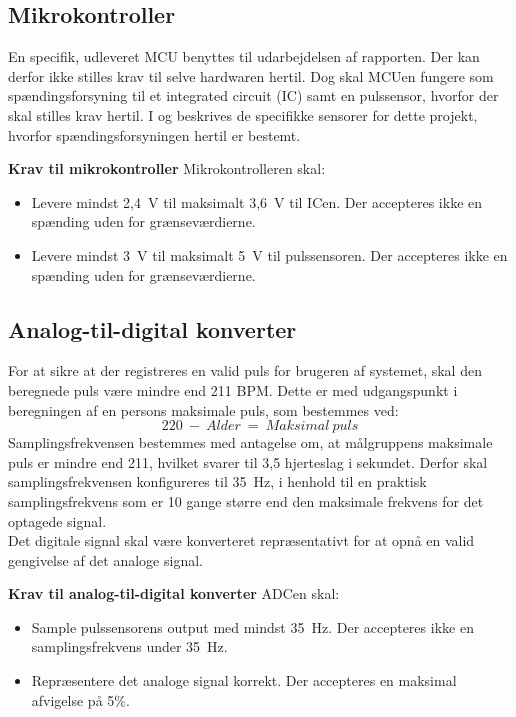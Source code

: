 \subsection{Mikrokontroller} \label{krav_mikro_spaending}
En specifik, udleveret MCU benyttes til udarbejdelsen af rapporten. Der kan derfor ikke stilles krav til selve hardwaren hertil. Dog skal MCUen fungere som spændingsforsyning til et integrated circuit (IC) samt en pulssensor, hvorfor der skal stilles krav hertil. I  og  beskrives de specifikke sensorer for dette projekt, hvorfor spændingsforsyningen hertil er bestemt.

\textbf{Krav til mikrokontroller} \newline 
Mikrokontrolleren skal:
\begin{itemize}
	\item Levere mindst 2,4~V til maksimalt 3,6~V til ICen. Der accepteres ikke en spænding uden for grænseværdierne.
	\item Levere mindst 3~V til maksimalt 5~V til pulssensoren. Der accepteres ikke en spænding uden for grænseværdierne.
\end{itemize}

\subsection{Analog-til-digital konverter} \label{krav_adc}
For at sikre at der registreres en valid puls for brugeren af systemet, skal den beregnede puls være mindre end 211 BPM. Dette er med udgangspunkt i beregningen af en persons maksimale puls, som bestemmes ved: \citep{CooperBlair2005} 
\begin{equation}
220~-~Alder~=~Maksimal~puls
\end{equation}
Samplingsfrekvensen bestemmes med antagelse om, at målgruppens maksimale puls er mindre end 211, hvilket svarer til 3,5 hjerteslag i sekundet. Derfor skal samplingsfrekvensen konfigureres til 35~Hz, i henhold til en praktisk samplingsfrekvens som er 10 gange større end den maksimale frekvens for det optagede signal. \citep{Webster2011}\\
Det digitale signal skal være konverteret repræsentativt for at opnå en valid gengivelse af det analoge signal.

\textbf{Krav til analog-til-digital konverter} \newline
ADCen skal:
\begin{itemize}
	\item Sample pulssensorens output med mindst 35~Hz. Der accepteres ikke en samplingsfrekvens under 35~Hz. 
	\item Repræsentere det analoge signal korrekt. Der accepteres en maksimal afvigelse på 5\%. 
\end{itemize}

